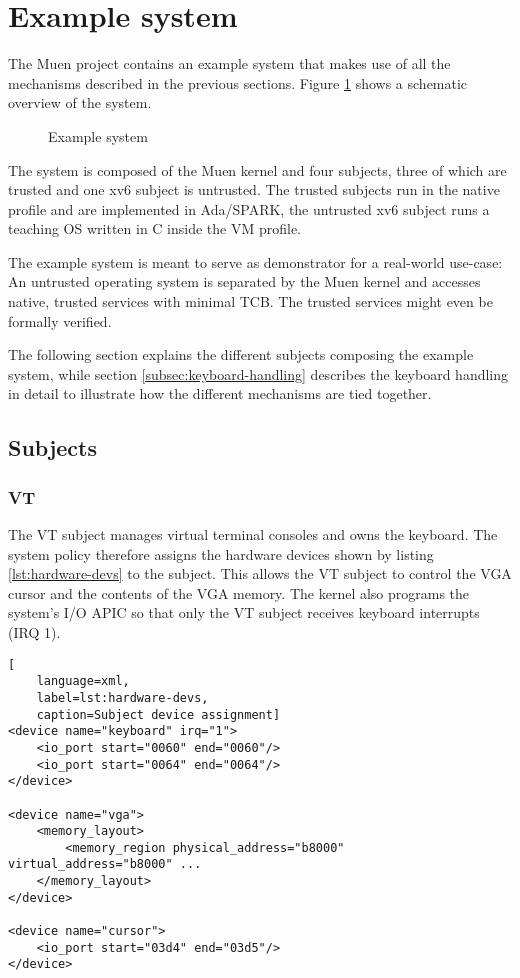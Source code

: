 \section{Example system}\label{sec:example-system}
The Muen project contains an example system that makes use of all the
mechanisms described in the previous sections. Figure \ref{fig:example-system}
shows a schematic overview of the system.

\begin{figure}[h]
	\centering
	
	\caption{Example system}
	\label{fig:example-system}
\end{figure}

The system is composed of the Muen kernel and four subjects, three of which are
trusted and one xv6 subject is untrusted. The trusted subjects run in the native
profile and are implemented in Ada/SPARK, the untrusted xv6 subject runs a teaching
OS written in C inside the VM profile.

The example system is meant to serve as demonstrator for a real-world use-case:
An untrusted operating system is separated by the Muen kernel and accesses
native, trusted services with minimal TCB. The trusted services might even be
formally verified.

The following section explains the different subjects composing the example
system, while section \ref{subsec:keyboard-handling} describes the keyboard
handling in detail to illustrate how the different mechanisms are tied
together.

\subsection{Subjects}

\subsubsection{VT}\label{subsubsec:subject-vt}
The VT subject manages virtual terminal consoles and owns the keyboard. The
system policy therefore assigns the hardware devices shown by listing
\ref{lst:hardware-devs} to the subject. This allows the VT subject to control
the VGA cursor and the contents of the VGA memory. The kernel also programs the
system's I/O APIC so that only the VT subject receives keyboard interrupts (IRQ
1).

\begin{lstlisting}[
	language=xml,
	label=lst:hardware-devs,
	caption=Subject device assignment]
<device name="keyboard" irq="1">
    <io_port start="0060" end="0060"/>
    <io_port start="0064" end="0064"/>
</device>

<device name="vga">
    <memory_layout>
        <memory_region physical_address="b8000" virtual_address="b8000" ...
    </memory_layout>
</device>

<device name="cursor">
    <io_port start="03d4" end="03d5"/>
</device>
\end{lstlisting}

